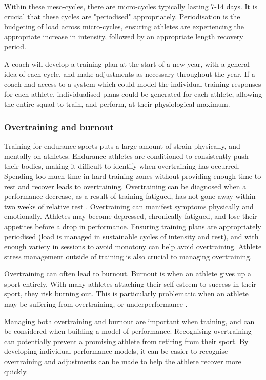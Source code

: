 Within these meso-cycles, there are micro-cycles typically lasting 7-14 days. It is crucial that these cycles are "periodised" appropriately. Periodisation is the budgeting of load across micro-cycles, ensuring athletes are experiencing the appropriate increase in intensity, followed by an appropriate length recovery period.

A coach will develop a training plan at the start of a new year, with a general idea of each cycle, and make adjustments as necessary throughout the year. If a coach had access to a system which could model the individual training responses for each athlete, individualised plans could be generated for each athlete, allowing the entire squad to train, and perform, at their physiological maximum. 

\subsubsection{Overtraining and burnout}
Training for endurance sports puts a large amount of strain physically, and mentally on athletes. Endurance athletes are conditioned to consistently push their bodies, making it difficult to identify when overtraining has occurred. Spending too much time in hard training zones without providing enough time to rest and recover leads to overtraining. Overtraining can be diagnosed when a performance decrease, as a result of training fatigued, has not gone away within two weeks of relative rest \cite{kayser2004chronic}. Overtraining can manifest symptoms physically and emotionally. Athletes may become depressed, chronically fatigued, and lose their appetites before a drop in performance. Ensuring training plans are appropriately periodised (load is managed in sustainable cycles of intensity and rest), and with enough variety in sessions to avoid monotony can help avoid overtraining. Athlete stress management outside of training is also crucial to managing overtraining.

Overtraining can often lead to burnout. Burnout is when an athlete gives up a sport entirely. With many athletes attaching their self-esteem to success in their sport, they risk burning out. This is particularly problematic when an athlete may be suffering from overtraining, or underperformance \cite{gustafsson2007burnout}.

Managing both overtraining and burnout are important when training, and can be considered when building a model of performance. Recognising overtraining can potentially prevent a promising athlete from retiring from their sport. By developing individual performance models, it can be easier to recognise overtraining and adjustments can be made to help the athlete recover more quickly.

